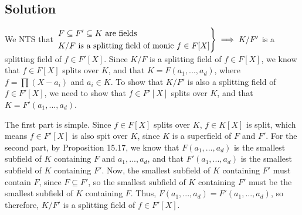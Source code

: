 \documentclass[fleqn]{article}
\begin{document}
        \subsection{Solution}
        We NTS that $\begin{rcases}
            F \subseteq F' \subseteq K \text{ are fields} \\
            K/F \text{ is a splitting field of monic } f \in F[X]
        \end{rcases} \implies K/F'$ is a splitting field of $f \in F'[X]$.  Since $K/F$ is a splitting field of $f \in F[X]$, we know that $f \in F[X]$ splits over $K$, and that $K = F(a_1, ..., a_d)$, where $f = \prod (X - a_i)$ and $a_i \in K$.  To show that $K/F'$ is also a splitting field of $f \in F'[X]$, we need to show that $f \in F'[X]$ splits over $K$, and that $K = F'(a_1, ..., a_d)$.
        
        The first part is simple.  Since $f \in F[X]$ splits over $K$, $f \in K[X]$ is split, which means $f \in F'[X]$ is also spit over $K$, since $K$ is a superfield of $F$ and $F'$.  For the second part, by Proposition 15.17, we know that $F(a_1, ..., a_d)$ is the smallest subfield of $K$ containing $F$ and $a_1, ..., a_d$, and that $F'(a_1, ..., a_d)$ is the smallest subfield of $K$ containing $F'$.  Now, the smallest subfield of $K$ containing $F'$ must contain $F$, since $F \subseteq F'$, so the smallest subfield of $K$ containing $F'$ must be the smallest subfield of $K$ containing $F$.  Thus, $F(a_1, ..., a_d) = F'(a_1, ..., a_d)$, so therefore, $K/F'$ is a splitting field of $f \in F'[X]$.
        
    
\end{document}

